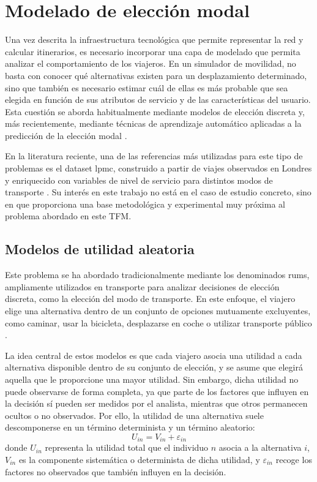 \section{Modelado de elección modal}

Una vez descrita la infraestructura tecnológica que permite representar la red y calcular itinerarios, es necesario incorporar una capa de modelado que permita analizar el comportamiento de los viajeros. En un simulador de movilidad, no basta con conocer qué alternativas existen para un desplazamiento determinado, sino que también es necesario estimar cuál de ellas es más probable que sea elegida en función de sus atributos de servicio y de las características del usuario. Esta cuestión se aborda habitualmente mediante modelos de elección discreta y, más recientemente, mediante técnicas de aprendizaje automático aplicadas a la predicción de la elección modal \cite{Train2009,MartinBaos2023Thesis}.\newline

En la literatura reciente, una de las referencias más utilizadas para este tipo de problemas es el dataset \gls{lpmc}, construido a partir de viajes observados en Londres y enriquecido con variables de nivel de servicio para distintos modos de transporte \cite{Hillel2018LPMC,CSLPMC2019}. Su interés en este trabajo no está en el caso de estudio concreto, sino en que proporciona una base metodológica y experimental muy próxima al problema abordado en este TFM.

\subsection{Modelos de utilidad aleatoria}

Este problema se ha abordado tradicionalmente mediante los denominados \glspl{rum}, ampliamente utilizados en transporte para analizar decisiones de elección discreta, como la elección del modo de transporte. En este enfoque, el viajero elige una alternativa dentro de un conjunto de opciones mutuamente excluyentes, como caminar, usar la bicicleta, desplazarse en coche o utilizar transporte público \cite{Train2009,McFadden1974}.\newline

La idea central de estos modelos es que cada viajero asocia una utilidad a cada alternativa disponible dentro de su conjunto de elección, y se asume que elegirá aquella que le proporcione una mayor utilidad. Sin embargo, dicha utilidad no puede observarse de forma completa, ya que parte de los factores que influyen en la decisión sí pueden ser medidos por el analista, mientras que otros permanecen ocultos o no observados. Por ello, la utilidad de una alternativa suele descomponerse en un término determinista y un término aleatorio:
\begin{equation}
U_{in} = V_{in} + \varepsilon_{in}
\end{equation}
donde $U_{in}$ representa la utilidad total que el individuo $n$ asocia a la alternativa $i$, $V_{in}$ es la componente sistemática o determinista de dicha utilidad, y $\varepsilon_{in}$ recoge los factores no observados que también influyen en la decisión.\newline

